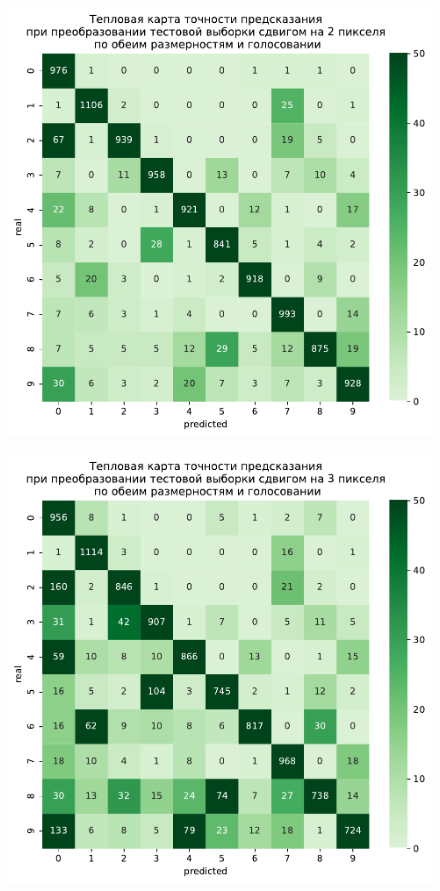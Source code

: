 \documentclass{article}
\begin{document}
\begin{figure}[h]
{\begin{minipage}{8cm}
		\end{minipage}
		\label{app6:shift1}
	}
	\subfigure
	{
	    \begin{minipage}{8cm}
	        \centering
	        \includegraphics[scale=0.35]{TASK1 test shift 2.pdf}
	    \end{minipage}
	    \label{app6:shift2}
	}
	\subfigure
	{
		\begin{minipage}{8cm}
			\centering
			\includegraphics[scale=0.35]{TASK1 test shift 3.pdf}
		\end{minipage}
		\label{app6:shift3}
	}
\end{figure}
\end{document}
